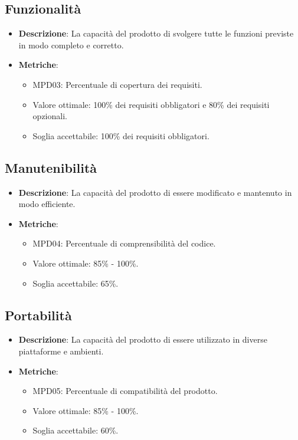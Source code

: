 \documentclass[12pt]{article}
\begin{document}
\subsection{Funzionalità}
\begin{itemize}
	\item \textbf{Descrizione}: La capacità del prodotto di svolgere tutte le funzioni previste in modo completo e corretto.
	\item \textbf{Metriche}:
	      \begin{itemize}
		      \item MPD03: Percentuale di copertura dei requisiti.
		      \item Valore ottimale: 100\% dei requisiti obbligatori e 80\% dei requisiti opzionali.
		      \item Soglia accettabile: 100\% dei requisiti obbligatori.
	      \end{itemize}
\end{itemize}

\subsection{Manutenibilità}
\begin{itemize}
	\item \textbf{Descrizione}: La capacità del prodotto di essere modificato e mantenuto in modo efficiente.
	\item \textbf{Metriche}:
	      \begin{itemize}
		      \item MPD04: Percentuale di comprensibilità del codice.
		      \item Valore ottimale: 85\% - 100\%.
		      \item Soglia accettabile: 65\%.
	      \end{itemize}
\end{itemize}

\subsection{Portabilità}
\begin{itemize}
	\item \textbf{Descrizione}: La capacità del prodotto di essere utilizzato in diverse piattaforme e ambienti.
	\item \textbf{Metriche}:
	      \begin{itemize}
		      \item MPD05: Percentuale di compatibilità del prodotto.
		      \item Valore ottimale: 85\% - 100\%.
		      \item Soglia accettabile: 60\%.
	      \end{itemize}
\end{itemize}
\end{document}
